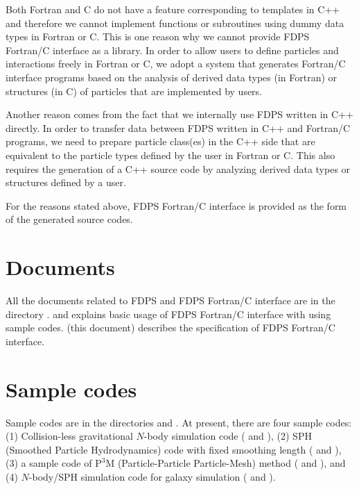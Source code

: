 Both Fortran and C do not have a feature corresponding to templates in C++ and therefore we cannot implement functions or subroutines using dummy data types in Fortran or C. This is one reason why we cannot provide FDPS Fortran/C interface as a library. In order to allow users to define particles and interactions freely in Fortran or C, we adopt a system that generates Fortran/C interface programs based on the analysis of derived data types {\small (in Fortran)} or structures {\small (in C)} of particles that are implemented by users.

Another reason comes from the fact that we internally use FDPS written in C++ directly. In order to transfer data between FDPS written in C++ and Fortran/C programs, we need to prepare particle class(es) in the C++ side that are equivalent to the particle types defined by the user in Fortran or C. This also requires the generation of a C++ source code by analyzing derived data types or structures defined by a user.

For the reasons stated above, FDPS Fortran/C interface is provided as the form of the generated source codes.

\section{Documents}
All the documents related to FDPS and FDPS Fortran/C interface are in the directory .  and  explains basic usage of FDPS Fortran/C interface with using sample codes.  (this document) describes the specification of FDPS Fortran/C interface.

\section{Sample codes}
\label{sec:sample_codes}
Sample codes are in the directories  and . At present, there are four sample codes: (1) Collision-less gravitational $N$-body simulation code ( and ), (2) SPH (Smoothed Particle Hydrodynamics) code with fixed smoothing length ( and ), (3) a sample code of $\mathrm{P^{3}M}$ (Particle-Particle Particle-Mesh) method ( and ), and (4) $N$-body/SPH simulation code for galaxy simulation ( and ).
